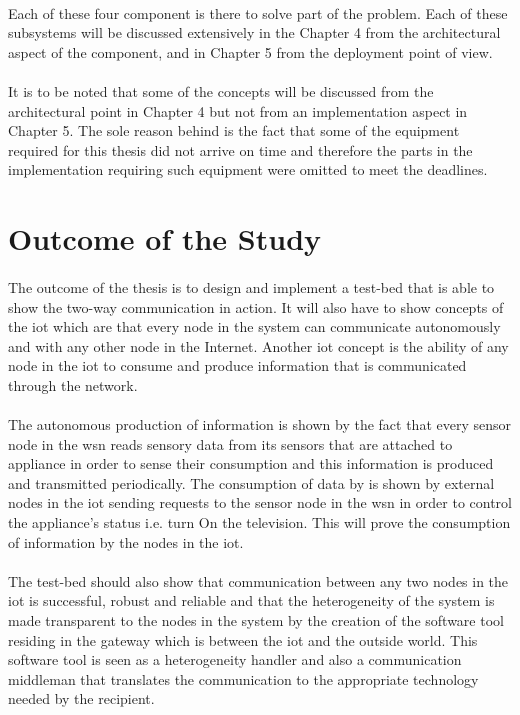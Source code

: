 \documentclass[oneside,12pt,a4paper,final]{book}
\begin{document}
\paragraph{}
Each of these four component is there to solve part of the problem. Each of these subsystems will be discussed extensively in the Chapter 4 from the architectural aspect of the component, and in Chapter 5 from the deployment point of view. 
\paragraph{}
It is to be noted that some of the concepts will be discussed from the architectural point in Chapter 4 but not from an implementation aspect in Chapter 5. The sole reason behind is the fact that some of the equipment required for this thesis did not arrive on time and therefore the parts in the implementation requiring such equipment were omitted to meet the deadlines.
\section{Outcome of the Study}
\paragraph{}
The outcome of the thesis is to design and implement a test-bed that is able to show the two-way communication in action. It will also have to show concepts of the \gls{iot} which are that every node in the system can communicate autonomously and with any other node in the Internet. Another \gls{iot} concept is the ability of any node in the \gls{iot} to consume and produce information that is communicated through the network.
\paragraph{}
The autonomous production of information is shown by the fact that every sensor node in the \gls{wsn} reads sensory data from its sensors that are attached to appliance in order to sense their consumption and this information is produced and transmitted periodically. The consumption of data by is shown by external nodes in the \gls{iot} sending requests to the sensor node in the \gls{wsn} in order to control the appliance's status i.e. turn On the television. This will prove the consumption of information by the nodes in the \gls{iot}.
\paragraph{}
The test-bed should also show that communication between any two nodes in the \gls{iot} is successful, robust and reliable and that the heterogeneity of the system is made transparent to the nodes in the system by the creation of the software tool residing in the gateway which is between the \gls{iot} and the outside world. This software tool is seen as a heterogeneity handler and also a communication middleman that translates the communication to the appropriate technology needed by the recipient.
\end{document}

